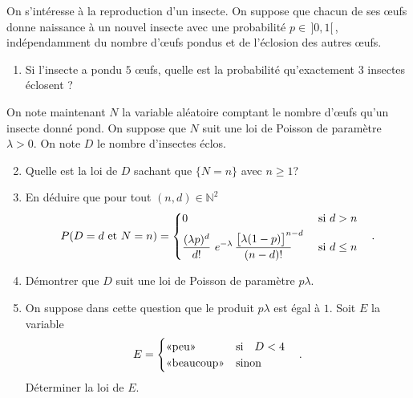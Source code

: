 \documentclass[12pt,reqno]{amsart}
\begin{document}
\tsvp
\begin{exo}

On s'intéresse à la reproduction d'un insecte. On suppose que chacun de ses  œufs donne naissance à un nouvel insecte avec une probabilité $p \in \,]0,1[$\,, indépendamment du nombre d'œufs pondus et de l'éclosion des autres œufs.
\begin{enumerate}
 \item Si l'insecte a pondu $5$ œufs, quelle est la probabilité qu'exactement $3$ insectes éclosent ?
\end{enumerate}

 On note maintenant $ N$ la variable aléatoire comptant le nombre d'œufs qu'un insecte donné pond. On suppose que $N$ suit une loi de Poisson de paramètre $\lambda>0$.  On note $D$ le nombre d'insectes éclos.
  \begin{enumerate}\setcounter{enumi}{1}
  \item Quelle est la loi de $D$ sachant que $\{N=n\}$ avec $n\ge 1$?

    \item En déduire que pour tout $(n, d)\in\mathbb{N}^2$
      $$
        P(D = d \text{ et } N = n)=
          \begin{dcases}
            0 & \text{ si } d>n \\
            \frac{(\lambda p)^d}{d!}
            ~e^{-\lambda}\,
            \frac{\big[\lambda (1-p)\big]^{\makebox[4pt][l]{$\scriptstyle n-d$}}}{(n-d)!}\quad
              & \text{ si } d\le n
          \end{dcases}\quad.
      $$

    \item Démontrer que $D$ suit une loi de Poisson de paramètre $p\lambda$.

    \item On suppose dans cette question que le produit $p\lambda$ est égal à $1$. Soit $E$ la variable
      $$
        E=
          \begin{cases}
            \text{«peu»} & \text{si\quad} D < 4\\
            \text{«beaucoup»} & \text{sinon}
          \end{cases}\quad.
      $$
      Déterminer la loi de $E$.

  \end{enumerate}

\end{exo}
\end{document}

